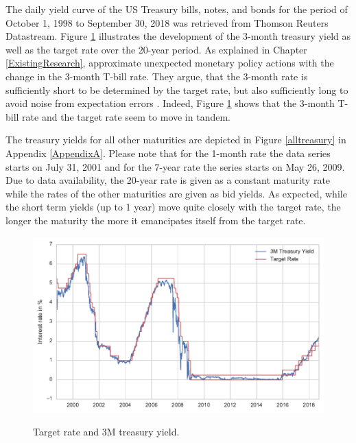 \documentclass[11pt,a4paper,english,oneside]{book}
\numberwithin{equation}{chapter}
\begin{document}
The daily yield curve of the US Treasury bills, notes, and bonds for the period of October 1, 1998 to September 30, 2018 was retrieved from Thomson Reuters Datastream. Figure \ref{3Mtreasury} illustrates the development of the 3-month treasury yield as well as the target rate over the 20-year period. As explained in Chapter \ref{ExistingResearch}, \citeauthor{Ellingsen.2003} approximate unexpected monetary policy actions with the change in the 3-month T-bill rate. They argue, that the 3-month rate is sufficiently short to be determined by the target rate, but also sufficiently long to avoid noise from expectation errors \citep[~p. 13]{Ellingsen.2003}. Indeed, Figure \ref{3Mtreasury} shows that the 3-month T-bill rate and the target rate seem to move in tandem.  

The treasury yields for all other maturities are depicted in Figure \ref{alltreasury} in Appendix \ref{AppendixA}. Please note that for the 1-month rate the data series starts on July 31, 2001 and for the 7-year rate the series starts on May 26, 2009. Due to data availability, the 20-year rate is given as a constant maturity rate while the rates of the other maturities are given as bid yields. As expected, while the short term yields (up to 1 year) move quite closely with the target rate, the longer the maturity the more it emancipates itself from the target rate. 


\begin{figure}
	\caption{Target rate and 3M treasury yield.}
	\centering
	\includegraphics[scale=1]{Images/3Mtreasury.pdf}
	\label{3Mtreasury}
\end{figure}
\end{document}
